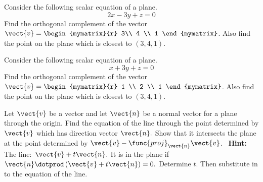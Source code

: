\begin{enumialphparenastyle}

\begin{ex} Consider the following scalar equation of a plane. 
\begin{equation*}
2x-3y+z=0
\end{equation*}
Find the orthogonal complement of the vector $\vect{v}=\begin{mymatrix}{r}
3\\
4 \\
1
\end{mymatrix} $.
Also find the point on the plane which is closest to $\left( 3,4,1\right) .$
\end{ex}


\begin{ex} Consider the following scalar equation of a plane. 
\begin{equation*}
x+3y+z=0
\end{equation*}
Find the orthogonal complement of the vector $\vect{v}=\begin{mymatrix}{r}
 1 \\
2 \\
1
\end{mymatrix} $.
Also find the point on the plane which is closest to $\left( 3,4,1\right) .$
\end{ex}

\begin{ex} Let $\vect{v}$ be a vector and let $\vect{n}$ be a normal vector for a
plane through the origin. Find the equation of the line through the point
determined by $\vect{v}$ which has direction vector $\vect{n}.$ Show that it
intersects the plane at the point determined by $\vect{v}-\func{proj}_{\vect{n}
}\vect{v}$. \ \textbf{Hint: }The line:\ $\vect{v}+t\vect{n}.$ It is in the
plane if $\vect{n}\dotprod \left( \vect{v}+t\vect{n}\right) =0.$ Determine $t$.
Then substitute in to the equation of the line.
\end{ex}


\end{enumialphparenastyle}
